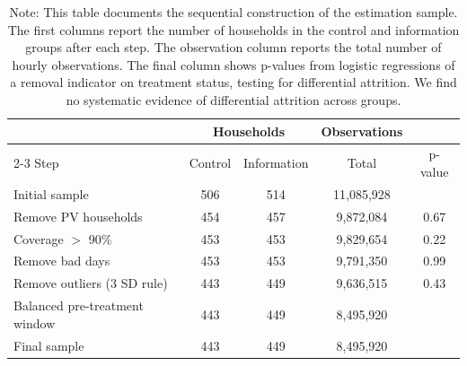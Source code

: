 \setcounter{table}{0}
\renewcommand{\thetable}{A.\arabic{table}}
\setcounter{figure}{0}
\renewcommand{\thefigure}{A.\arabic{figure}}

\begin{table}[H]
\centering
\caption{Sample construction and selection diagnostics}
\label{tab:sample_selection}
\begin{tabular}{lcccc}
\toprule
 & \multicolumn{2}{c}{Households} & Observations &  \\
\cmidrule(lr){2-3}
Step & Control & Information & Total & p-value \\
\midrule

Initial sample 
& 506 & 514 & 11,085,928 &  \\

Remove PV households 
& 454 & 457 & 9,872,084 & 0.67 \\

Coverage $>$ 90\% 
& 453 & 453 & 9,829,654 & 0.22 \\

Remove bad days 
& 453 & 453 & 9,791,350 & 0.99 \\

Remove outliers (3 SD rule) 
& 443 & 449 & 9,636,515 & 0.43 \\

Balanced pre-treatment window 
& 443 & 449 & 8,495,920 &  \\

\midrule
Final sample 
& 443 & 449 & 8,495,920 &  \\

\bottomrule
\end{tabular}

\caption*{\footnotesize
Note: This table documents the sequential construction of the estimation sample. The first columns report the number of households in the control and information groups after each step. The observation column reports the total number of hourly observations. The final column shows p-values from logistic regressions of a removal indicator on treatment status, testing for differential attrition. We find no systematic evidence of differential attrition across groups.}
\end{table}

